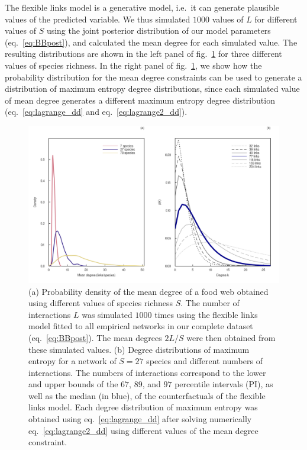 \documentclass[10pt,oneside]{article}
\makeatletter
\def\maxwidth{\ifdim\Gin@nat@width>\linewidth\linewidth
\else\Gin@nat@width\fi}
\let\Oldincludegraphics\includegraphics
\renewcommand{\includegraphics}[1]{\Oldincludegraphics[width=\maxwidth]{#1}}
\makeatother
\begin{document}
The flexible links model is a generative model, i.e.~it can generate
plausible values of the predicted variable. We thus simulated \(1000\)
values of \(L\) for different values of \(S\) using the joint posterior
distribution of our model parameters (eq.~\ref{eq:BBpost}), and
calculated the mean degree for each simulated value. The resulting
distributions are shown in the left panel of
fig.~\ref{fig:degree_dist_fl} for three different values of species
richness. In the right panel of fig.~\ref{fig:degree_dist_fl}, we show
how the probability distribution for the mean degree constraints can be
used to generate a distribution of maximum entropy degree distributions,
since each simulated value of mean degree generates a different maximum
entropy degree distribution (eq.~\ref{eq:lagrange_dd} and
eq.~\ref{eq:lagrange2_dd}).

\begin{figure}
\hypertarget{fig:degree_dist_fl}{%
\centering
\includegraphics{figures/maxent_degree_dist_fl.png}
\caption{(a) Probability density of the mean degree of a food web
obtained using different values of species richness \(S\). The number of
interactions \(L\) was simulated \(1000\) times using the flexible links
model fitted to all empirical networks in our complete dataset
(eq.~\ref{eq:BBpost}). The mean degrees \(2L/S\) were then obtained from
these simulated values. (b) Degree distributions of maximum entropy for
a network of \(S=27\) species and different numbers of interactions. The
numbers of interactions correspond to the lower and upper bounds of the
\(67%
\), \(89%
\), and \(97%
\) percentile intervals (PI), as well as the median (in blue), of the
counterfactuals of the flexible links model. Each degree distribution of
maximum entropy was obtained using eq.~\ref{eq:lagrange_dd} after
solving numerically eq.~\ref{eq:lagrange2_dd} using different values of
the mean degree constraint.}\label{fig:degree_dist_fl}
}
\end{figure}
\end{document}
